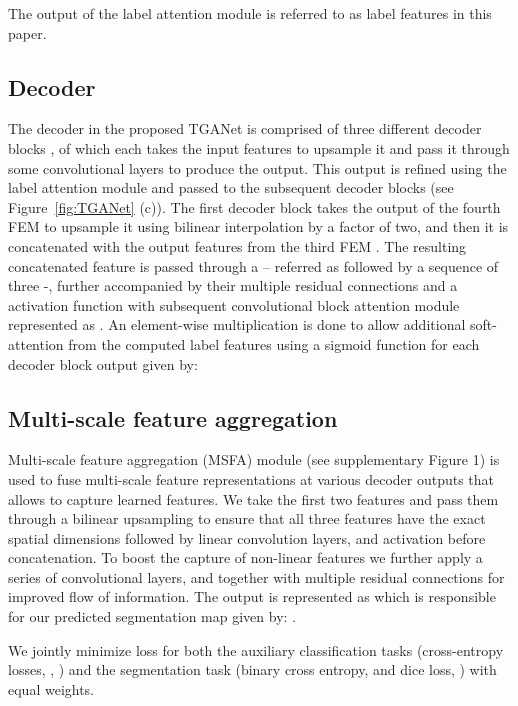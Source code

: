 \documentclass[runningheads]{llncs}
\begin{document}
The output of the label attention module is referred to as label features  in this paper. 

\subsection{Decoder}
The decoder in the proposed TGANet is comprised of three different decoder blocks , of which each takes the input features to upsample it and pass it through some convolutional layers to produce the output. This output is refined using the label attention module  and passed to the subsequent decoder blocks  (see Figure~\ref{fig:TGANet} (c)). The first decoder block takes the output of the fourth FEM   to upsample it using bilinear interpolation by a factor of two, and then it is concatenated with the output features from the third FEM . The resulting concatenated feature is passed through a -- referred as  followed by a sequence of three -, further accompanied by their multiple residual connections and a  activation function with subsequent convolutional block attention module represented as . An element-wise multiplication is done to allow additional soft-attention from the computed label features  using a sigmoid function for each decoder block output  given by:


\subsection{Multi-scale feature aggregation}
Multi-scale feature aggregation (MSFA) module (see supplementary Figure 1) is used to fuse multi-scale feature representations at various decoder outputs  that allows to capture learned features. We take the first two features  and pass them through a bilinear upsampling to ensure that all three features have the exact spatial dimensions followed by linear  convolution layers,  and  activation before concatenation. To boost the capture of non-linear features we further apply a series of convolutional layers,  and  together with multiple residual connections for improved flow of information. The output is represented as  which is responsible for our predicted segmentation map  given by: .

 We jointly minimize loss for both the auxiliary classification tasks (cross-entropy losses, , ) and the segmentation task (binary cross entropy,  and dice loss, ) with equal weights.
\end{document}
